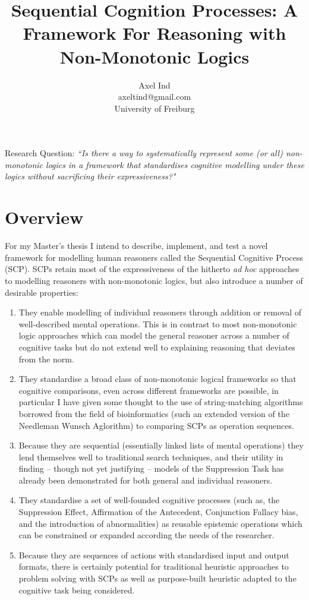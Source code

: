 \documentclass{article}
\begin{document}
\title{Sequential Cognition Processes: A Framework For Reasoning with Non-Monotonic Logics}
\author{Axel Ind \\ axeltind@gmail.com \\ University of Freiburg}

\maketitle

Research Question: \textit{``Is there a way to systematically represent some (or all) non-monotonic logics in a framework that standardises cognitive modelling under these logics without sacrificing their expressiveness?"}

\section{Overview}
For my Master's thesis I intend to describe, implement, and test a novel framework for modelling human reasoners called the Sequential Cognitive Process (SCP). SCPs retain most of the expressiveness of the hitherto \textit{ad hoc} approaches to modelling reasoners with non-monotonic logics, but also introduce a number of desirable properties:
\begin{enumerate}
\item They enable modelling of individual reasoners through addition or removal of well-described mental operations. This is in contrast to most non-monotonic logic approaches which can model the general reasoner across a number of cognitive tasks but do not extend well to explaining reasoning that deviates from the norm.
\item They standardise a broad class of non-monotonic logical frameworks so that cognitive comparisons, even across different frameworks are possible, in particular I have given some thought to the use of string-matching algorithms borrowed from the field of bioinformatics (such an extended version of the Needleman Wunsch Aglorithm\citep{needleman1970general}) to comparing SCPs as operation sequences.
\item Because they are sequential (essentially linked lists of mental operations) they lend themselves well to traditional search techniques, and their utility in finding -- though not yet justifying -- models of the Suppression Task has already been demonstrated for both general and individual reasoners.
\item They standardise a set of well-founded cognitive processes (such as, the Suppression Effect, Affirmation of the Antecedent, Conjunction Fallacy bias, and the introduction of abnormalities) as reusable epistemic operations which can be constrained or expanded according the needs of the researcher.
\item Because they are sequences of actions with standardised input and output formats, there is certainly potential for traditional heuristic approaches to problem solving with SCPs as well as purpose-built heuristic adapted to the cognitive task being considered.
\end{enumerate}
\end{document}
